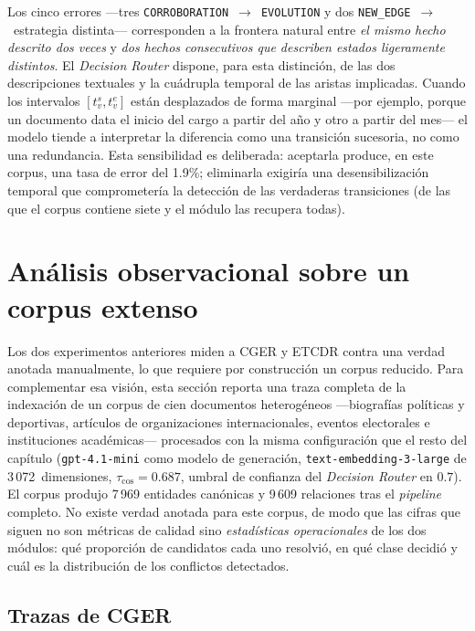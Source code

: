 Los cinco errores ---tres \texttt{CORROBORATION}~$\to$~\texttt{EVOLUTION} y dos \texttt{NEW\_EDGE}~$\to$~estrategia distinta--- corresponden a la frontera natural entre \emph{el mismo hecho descrito dos veces} y \emph{dos hechos consecutivos que describen estados ligeramente distintos}. El \emph{Decision Router} dispone, para esta distinción, de las dos descripciones textuales y la cuádrupla temporal de las aristas implicadas. Cuando los intervalos $[t_v^s, t_v^e]$ están desplazados de forma marginal ---por ejemplo, porque un documento data el inicio del cargo a partir del año y otro a partir del mes--- el modelo tiende a interpretar la diferencia como una transición sucesoria, no como una redundancia. Esta sensibilidad es deliberada: aceptarla produce, en este corpus, una tasa de error del 1.9\%; eliminarla exigiría una desensibilización temporal que comprometería la detección de las verdaderas transiciones (de las que el corpus contiene siete y el módulo las recupera todas).

\section{Análisis observacional sobre un corpus extenso}\label{sec:eval-ragtest}

Los dos experimentos anteriores miden a CGER y ETCDR contra una verdad anotada manualmente, lo que requiere por construcción un corpus reducido. Para complementar esa visión, esta sección reporta una traza completa de la indexación de un corpus de cien documentos heterogéneos ---biografías políticas y deportivas, artículos de organizaciones internacionales, eventos electorales e instituciones académicas--- procesados con la misma configuración que el resto del capítulo (\texttt{gpt-4.1-mini} como modelo de generación, \texttt{text-embedding-3-large} de 3\,072~dimensiones, $\tau_{\cos} = 0.687$, umbral de confianza del \emph{Decision Router} en $0.7$). El corpus produjo 7\,969 entidades canónicas y 9\,609 relaciones tras el \emph{pipeline} completo. No existe verdad anotada para este corpus, de modo que las cifras que siguen no son métricas de calidad sino \emph{estadísticas operacionales} de los dos módulos: qué proporción de candidatos cada uno resolvió, en qué clase decidió y cuál es la distribución de los conflictos detectados.

\subsection{Trazas de CGER}

